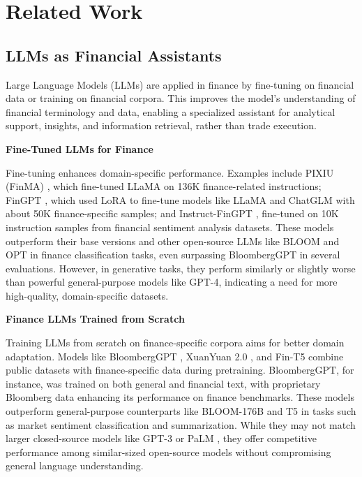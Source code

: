 \section{Related Work}

\subsection{LLMs as Financial Assistants}

Large Language Models (LLMs) are applied in finance by fine-tuning on financial data or training on financial corpora. This improves the model’s understanding of financial terminology and data, enabling a specialized assistant for analytical support, insights, and information retrieval, rather than trade execution. 


\textbf{Fine-Tuned LLMs for Finance}

Fine-tuning enhances domain-specific performance. Examples include PIXIU (FinMA) \citep{xie2023pixiu}, which fine-tuned LLaMA on 136K finance-related instructions; FinGPT \citep{touvron2023llama2openfoundation, yang2023fingpt}, which used LoRA to fine-tune models like LLaMA and ChatGLM with about 50K finance-specific samples; and Instruct-FinGPT \citep{zhang2023instructfingpt}, fine-tuned on 10K instruction samples from financial sentiment analysis datasets. These models outperform their base versions and other open-source LLMs like BLOOM and OPT \citep{zhang2022opt} in finance classification tasks, even surpassing BloombergGPT \citep{wu2023bloomberggpt} in several evaluations. However, in generative tasks, they perform similarly or slightly worse than powerful general-purpose models like GPT-4, indicating a need for more high-quality, domain-specific datasets.

\textbf{Finance LLMs Trained from Scratch}

Training LLMs from scratch on finance-specific corpora aims for better domain adaptation. Models like BloombergGPT \citep{wu2023bloomberggpt}, XuanYuan 2.0 \citep{zhang2023xuanyuan}, and Fin-T5 \citep{lu2023bbtfin} combine public datasets with finance-specific data during pretraining. BloombergGPT, for instance, was trained on both general and financial text, with proprietary Bloomberg data enhancing its performance on finance benchmarks. These models outperform general-purpose counterparts like BLOOM-176B and T5 in tasks such as market sentiment classification and summarization. While they may not match larger closed-source models like GPT-3 or PaLM \citep{chowdhery2022palm}, they offer competitive performance among similar-sized open-source models without compromising general language understanding.

